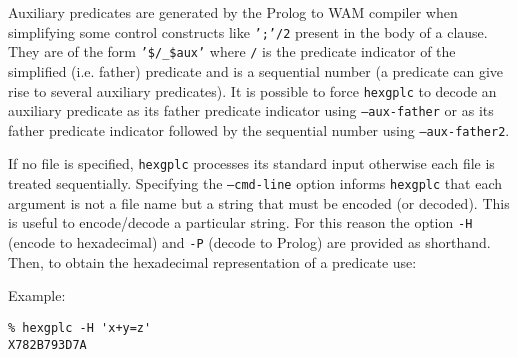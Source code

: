 Auxiliary predicates are generated by the Prolog to WAM compiler when
simplifying some control constructs like \texttt{';'/2} present in the body
of a clause. They are of the form
\texttt{'\$/\_\$aux'} where
\texttt{/} is the predicate indicator of the
simplified (i.e. father) predicate and  is a sequential
number (a predicate can give rise to several auxiliary predicates). It is
possible to force \texttt{hexgplc} to decode an auxiliary predicate as its
father predicate indicator using \texttt{--aux-father} or as its father
predicate indicator followed by the sequential number using
\texttt{--aux-father2}.

If no file is specified, \texttt{hexgplc} processes its standard input
otherwise each file is treated sequentially. Specifying the
\texttt{--cmd-line} option informs \texttt{hexgplc} that each argument is not
a file name but a string that must be encoded (or decoded). This is useful to
encode/decode a particular string. For this reason the option \texttt{-H}
(encode to hexadecimal) and \texttt{-P} (decode to Prolog) are provided as
shorthand.  Then, to obtain the hexadecimal representation of a predicate
 use: 


Example:

\begin{Indentation}
\begin{verbatim}
% hexgplc -H 'x+y=z'
X782B793D7A
\end{verbatim}
\end{Indentation}

